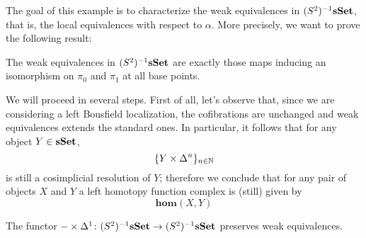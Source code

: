 \begin{refsection}
The goal of this example is to characterize the weak equivalences in $(S^2)^{-1} \mathbf{sSet}$, that is, the local equivalences with respect to $\alpha$. More precisely, we want to prove the following result:

\begin{prop} \label{prop S^2 nullification}
The weak equivalences in $(S^2)^{-1} \mathbf{sSet}$ are exactly those maps inducing an isomorphism on $\pi_0$ and $\pi_1$ at all base points.
\end{prop}

We will proceed in several steps. First of all, let's observe that, since we are considering a left Bousfield localization, the cofibrations are unchanged and weak equivalences extends the standard ones. In particular, it follows that for any object $Y \in \mathbf{sSet}$,
\[
\{Y \times \Delta^n\}_{n \in \mathbb{N}}
\]
is still a cosimplicial resolution of $Y$; therefore we conclude that for any pair of objects $X$ and $Y$ a left homotopy function complex is (still) given by
\[
\mathbf{hom}(X,Y)
\]

\begin{lemma} \label{lemma S^2 nullification 1}
The functor $- \times \Delta^1 \colon (S^2)^{-1} \mathbf{sSet} \to (S^2)^{-1} \mathbf{sSet}$ preserves weak equivalences.
\end{lemma}


\end{refsection}
